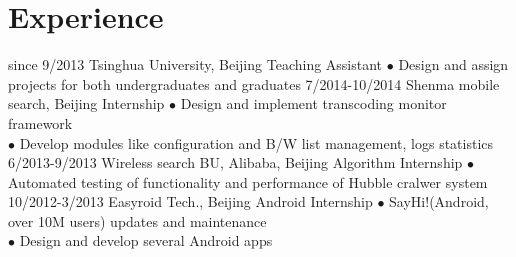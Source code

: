 \documentclass[]{friggeri-cv}
\begin{document}
\section{Experience}

\begin{entrylist}
  \entry
    {since 9/2013}
    {Tsinghua University, Beijing}
    {Teaching Assistant}
    {$\bullet$ Design and assign projects for both undergraduates and graduates}
  \entry
    {7/2014-10/2014}
    {Shenma mobile search, Beijing}
    {Internship}
    {$\bullet$ Design and implement transcoding monitor framework\\
    $\bullet$ Develop modules like configuration and B/W list management, logs statistics}
  \entry
    {6/2013-9/2013}
    {Wireless search BU, Alibaba, Beijing}
    {Algorithm Internship}
    {$\bullet$ Automated testing of functionality and performance of Hubble cralwer system}
  \entry
    {10/2012-3/2013}
    {Easyroid Tech., Beijing}
    {Android Internship}
    {$\bullet$ SayHi!(Android, over 10M users) updates and maintenance\\
    $\bullet$ Design and develop several Android apps}
\end{entrylist}
\end{document}
